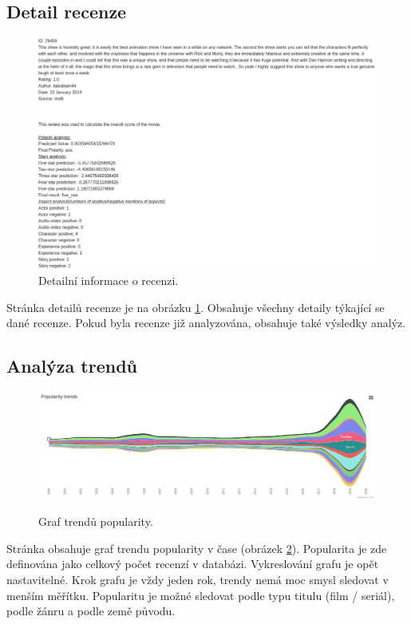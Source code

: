 \subsection{Detail recenze}
\FloatBarrier
\begin{figure}[!htb]
\label{reviewd}
\centering
\includegraphics[width=\textwidth]{reviewdetail.png}
\caption{Detailní informace o recenzi.}
\end{figure}
\FloatBarrier
Stránka detailů recenze je na obrázku \ref{reviewd}. Obsahuje všechny detaily týkající se dané recenze. Pokud byla recenze již analyzována, obsahuje také výsledky analýz.

\pagebreak
\subsection{Analýza trendů}
\FloatBarrier
\begin{figure}[!htb]
\centering
\includegraphics[width=\textwidth]{genres.png}
\label{trend}
\caption{Graf trendů popularity.}
\end{figure}
\FloatBarrier
Stránka obsahuje graf trendu popularity v čase (obrázek \ref{trend}). Popularita je zde definována jako celkový počet recenzí v databázi. Vykreslování grafu je opět nastavitelné. Krok grafu je vždy jeden rok, trendy nemá moc smysl sledovat v menším měřítku. Popularitu je možné sledovat podle typu titulu (film / seriál), podle žánru a podle země původu.

